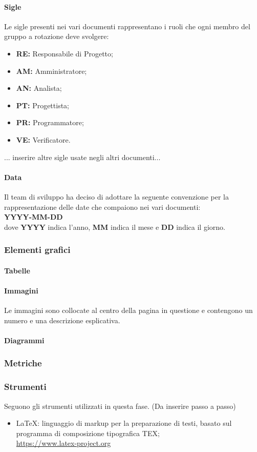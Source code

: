 \paragraph{Sigle}
Le sigle presenti nei vari documenti rappresentano i ruoli che ogni membro del gruppo a rotazione deve svolgere:
\begin{itemize}
    \item \textbf{RE:} Responsabile di Progetto;
    \item \textbf{AM:} Amministratore;
    \item \textbf{AN:} Analista;
    \item \textbf{PT:} Progettista;
    \item \textbf{PR:} Programmatore;
    \item \textbf{VE:} Verificatore.
\end {itemize}
... inserire altre sigle usate negli altri documenti...
\paragraph{Data}
Il team di sviluppo ha deciso di adottare la seguente convenzione per la rappresentazione delle date che compaiono nei vari documenti:\\
\textbf{YYYY-MM-DD}\\
dove \textbf{YYYY} indica l'anno, \textbf{MM} indica il mese e \textbf{DD} indica il giorno.

\subsubsection{Elementi grafici}
\paragraph{Tabelle}

\paragraph{Immagini}
Le immagini sono collocate al centro della pagina in questione e contengono un numero e una descrizione esplicativa.
\paragraph{Diagrammi}
\subsubsection{Metriche}
\subsubsection{Strumenti}
Seguono gli strumenti utilizzati in questa fase. (Da inserire passo a passo)
\begin{itemize}
    \item \LaTeX: linguaggio di markup per la preparazione di testi, basato sul programma di composizione tipografica TEX;\\
         \url{https://www.latex-project.org}
    
\end{itemize}



